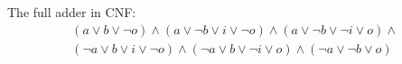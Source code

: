 \begin{frame}
\begin{columns}
\begin{column}{9cm}
\end{column}
\end{columns}
\vfill

The full adder in CNF:
%
\[\begin{array}{l}
(     a \lor      b \lor             \neg o) \land
(     a \lor \neg b \lor      i \lor \neg o) \land
(     a \lor \neg b \lor \neg i \lor      o) \land\\
(\neg a \lor      b \lor      i \lor \neg o) \land
(\neg a \lor      b \lor \neg i \lor      o) \land
(\neg a \lor \neg b \lor                  o)
\end{array}\]

\end{frame}



